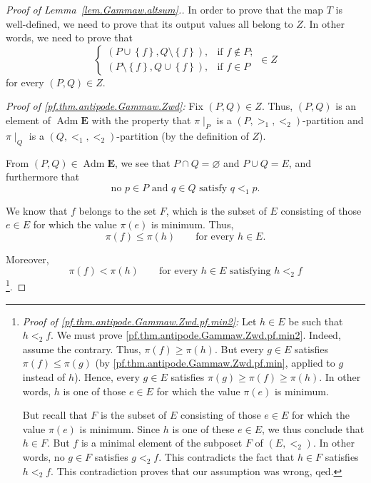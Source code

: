 \documentclass[12pt]{article}
\theoremstyle{plain}
\theoremstyle{definition}
\theoremstyle{remark}
\newcommand{\Adm}{\operatorname{Adm}}
\newcommand{\EE}{{\mathbf{E}}}
\begin{document}
\begin{proof}[Proof of Lemma~\ref{lem.Gammaw.altsum}.]
In order to prove that the map $T$ is well-defined, we need to prove that its
output values all belong to $Z$. In other words, we need to prove that
\begin{equation}
\begin{cases}
\left(  P\cup\left\{  f\right\}  ,Q\setminus\left\{  f\right\}  \right)  , &
\text{if }f\notin P;\\
\left(  P\setminus\left\{  f\right\}  ,Q\cup\left\{  f\right\}  \right)  , &
\text{if }f\in P
\end{cases}
\in Z
\label{pf.thm.antipode.Gammaw.Zwd}
\end{equation}
for every $\left(  P,Q\right)  \in Z$.

\textit{Proof of \eqref{pf.thm.antipode.Gammaw.Zwd}:} Fix $\left(  P,Q\right)
\in Z$. Thus, $\left(  P,Q\right)  $ is an element of
$ \Adm \EE$ with the property that
$\pi\mid_{P}$ is a $\left(  P,>_{1},<_{2}\right)  $-partition
and $\pi\mid_{Q}$ is a $\left(  Q,<_{1},<_{2}\right)  $-partition
(by the definition of $Z$).

From $\left(  P,Q\right)  \in \Adm \EE$, we see that
$P\cap Q=\varnothing$ and $P\cup Q=E$, and furthermore that
\begin{equation}
\text{no }p\in P\text{ and }q\in Q\text{ satisfy }q<_{1}
p.
\label{pf.thm.antipode.Gammaw.Zwd.pf.Adm}
\end{equation}

We know that $f$ belongs to the set $F$, which is the subset of $E$ consisting
of those $e\in E$ for which the value $\pi \left( e \right)$
is minimum. Thus,
\begin{equation}
\pi\left(  f\right)  \leq\pi\left(  h\right)  \qquad\text{for every }h\in
E.
\label{pf.thm.antipode.Gammaw.Zwd.pf.min}
\end{equation}


Moreover,
\begin{equation}
\pi\left(  f\right)  <\pi\left(  h\right)
\qquad\text{for every } h\in E \text{ satisfying } h<_{2}f
\label{pf.thm.antipode.Gammaw.Zwd.pf.min2}
\end{equation}
\footnote{\textit{Proof of \eqref{pf.thm.antipode.Gammaw.Zwd.pf.min2}:} Let
$h\in E$ be such that $h<_{2}f$. We must prove
\eqref{pf.thm.antipode.Gammaw.Zwd.pf.min2}. Indeed, assume the contrary. Thus,
$\pi \left( f \right) \geq \pi \left( h \right)$.
But every $g \in E$ satisfies
$\pi \left( f \right) \leq \pi \left( g \right)$
(by \eqref{pf.thm.antipode.Gammaw.Zwd.pf.min}, applied to
$g$ instead of $h$). Hence, every $g \in E$ satisfies
$\pi \left( g \right) \geq \pi \left( f \right)
\geq \pi \left( h \right)$. In other words,
$h$ is one of those $e\in E$ for which the value
$\pi \left( e \right)$ is minimum.
\par
But recall that $F$ is the subset of $E$ consisting
of those $e\in E$ for which the value $\pi \left( e \right)$
is minimum. Since $h$ is one of these $e\in E$,
we thus conclude that $h \in F$.
But $f$ is a minimal element
of the subposet $F$ of $\left(E, <_2\right)$.
In other words, no $g\in F$ satisfies $g<_{2}f$. This contradicts the
fact that $h\in F$ satisfies $h<_{2}f$. This contradiction proves that our
assumption was wrong, qed.}.


\end{proof}
\end{document}
